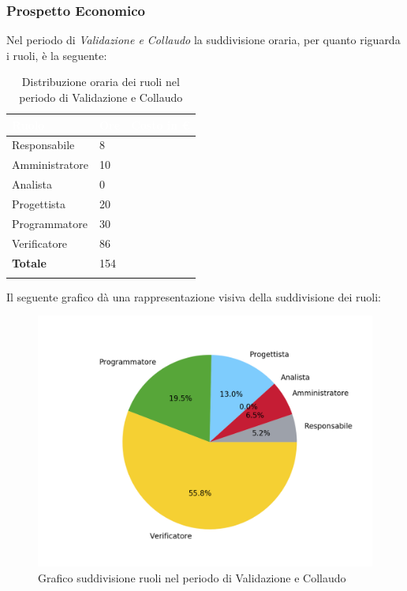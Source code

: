 \subsubsection{Prospetto Economico}
Nel periodo di \textit{Validazione e Collaudo} la suddivisione oraria, per quanto riguarda i ruoli, è la seguente: 


\begin{longtable}{| C{.30\textwidth}| C{.15\textwidth}| C{.20\textwidth}|}
	\hline
	\textbf{\textcolor{white}{Ruolo}} & \textbf{\textcolor{white}{Ore}} & \textbf{\textcolor{white}{Costo in \euro}} \\
	\hline 
	Responsabile & 8 &  \\
	\hline
	Amministratore & 10 & \\
	\hline
	Analista & 0 &  \\
	\hline
	Progettista & 20 &  \\
	\hline
	Programmatore & 30 &  \\
	\hline
	Verificatore & 86 &  \\
	\hline
	\textbf{Totale} & 154 & \\ 
	\hline
	
	\caption{Distribuzione oraria dei ruoli nel periodo di Validazione e Collaudo}
	\label{Distribuzione oraria del periodo di Validazione e collaudo}
\end{longtable}

Il seguente grafico dà una rappresentazione visiva della suddivisione dei ruoli:
\begin{figure}[H]
	\centering
	\includegraphics[width=1\linewidth]{./images/torta_vc.png}
	\caption{Grafico suddivisione ruoli nel periodo di Validazione e Collaudo}
	\label{fig:grafico suddivione ruoli periodo di Validazione e collaudo}
\end{figure}

